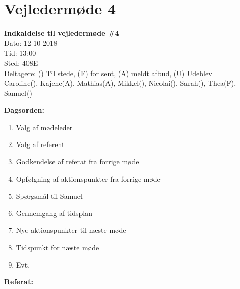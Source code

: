 \section{Vejledermøde 4}

\vspace{0.5 cm}
\textbf{Indkaldelse til vejledermøde \#4} \\

Dato: 12-10-2018 \\
Tid: 13:00 \\
Sted: 408E \\
Deltagere: () Til stede, (F) for sent, (A) meldt afbud, (U) Udeblev \\
Caroline(), Kajene(A), Mathias(A), Mikkel(), Nicolai(), Sarah(), Thea(F), Samuel() 

\vspace{0.1 cm}
\textbf{Dagsorden:}

\begin{enumerate}
	\item Valg af mødeleder
	\item Valg af referent
	\item Godkendelse af referat fra forrige møde
	\item Opfølgning af aktionspunkter fra forrige møde
	\item Spørgsmål til Samuel
	\item Gennemgang af tidsplan
	\item Nye aktionspunkter til næste møde
	\item Tidspunkt for næste møde
	\item Evt.
\end{enumerate}

\textbf{Referat:}

